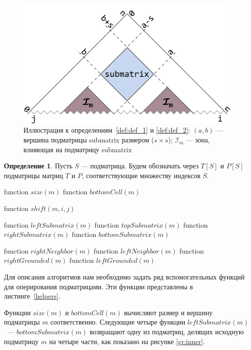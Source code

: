 \documentclass[a4paper,12pt]{article}  %
\theoremstyle{definition}
\newtheorem{definition}{Определение}[section]
\theoremstyle{remark}
\begin{document}
\begin{figure}[!h]
  \centering
    \includegraphics[width=0.9\linewidth]{submatrix.png}
  \caption{Иллюстрация к определениям~\ref{def:def_1} и \ref{def:def_2}: $(a,b)$ --- вершина подматрицы submatrix размером ($s\times s$); $\mathcal{I}_m$ --- зона, влияющая на подматрицу submatrix}
  \label{gr:submatrix}
\end{figure}

\begin{definition}
Пусть $S$ --- подматрица. Будем обозначать через $T[S]$ и $P[S]$ подматрицы матриц $T$ и $P$, соответствующие множеству индексов $S$.
\end{definition}

\pagebreak

\begin{algorithm}[caption={Вспомогательные функции обработки подматриц}, label={helpers}]
function $size(m)$
function $bottomCell(m)$

function $shift(m, i, j)$

function $leftSubmatrix(m)$
function $topSubmatrix(m)$
function $rightSubmatrix(m)$
function $bottomSubmatrix(m)$

function $rightNeighbor(m)$
function $leftNeighbor(m)$
function $rightGrounded(m)$
function $leftGrounded(m)$     
\end{algorithm}

Для описания алгоритмов нам необходимо задать ряд вспомогательных функций для оперирования подматрицами. Эти функции представлены в листинге~\ref{helpers}.

Функции $size(m)$ и $bottomCell(m)$ вычисляют размер и вершину подматрицы $m$ соответственно. Следующие четыре функции $leftSubmatrix(m)$~--- $bottomSubmatrix(m)$ возвращают одну из подматриц, делящих исходную подматрицу $m$ на четыре части, как показано на рисунке \ref{gr:inner}.
\end{document}
